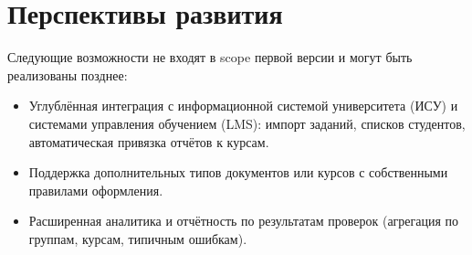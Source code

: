 \section{Перспективы развития}

Следующие возможности не входят в scope первой версии и могут быть реализованы позднее:

\begin{itemize}
  \item Углублённая интеграция с информационной системой университета (ИСУ) и системами управления обучением (LMS): импорт заданий, списков студентов, автоматическая привязка отчётов к курсам.
  \item Поддержка дополнительных типов документов или курсов с собственными правилами оформления.
  \item Расширенная аналитика и отчётность по результатам проверок (агрегация по группам, курсам, типичным ошибкам).
\end{itemize}
